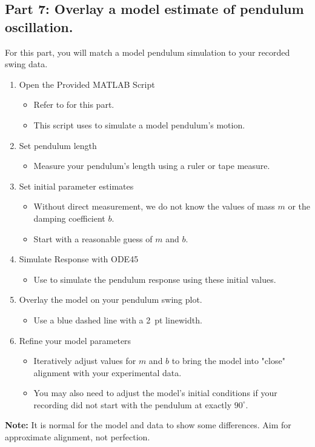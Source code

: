 \documentclass{article}
\begin{document}
\subsection{Part 7: Overlay a model estimate of pendulum oscillation. }
For this part, you will match a model pendulum simulation to your recorded swing data.

\begin{enumerate}
    \item Open the Provided MATLAB Script
    \begin{itemize}
        \item Refer to  for this part.
        \item This script uses  to simulate a model pendulum’s motion.
    \end{itemize}

    \item Set pendulum length
    \begin{itemize}
        \item Measure your pendulum’s length using a ruler or tape measure.
    \end{itemize}

    \item Set initial parameter estimates
    \begin{itemize}
        \item Without direct measurement, we do not know the values of mass $m$ or the damping coefficient $b$.
        \item Start with a reasonable guess of $m$ and $b$.
    \end{itemize}

    \item Simulate Response with ODE45
    \begin{itemize}
        \item Use  to simulate the pendulum response using these initial values.
    \end{itemize}

    \item Overlay the model on your pendulum swing plot.
    \begin{itemize}
        \item Use a blue dashed line with a 2~pt linewidth.
    \end{itemize}
    
    \item Refine your model parameters
    \begin{itemize}
        \item Iteratively adjust values for $m$ and $b$ to bring the model into "close" alignment with your experimental data.
        \item You may also need to adjust the model’s initial conditions if your recording did not start with the pendulum at exactly $90^\circ$.
    \end{itemize}
\end{enumerate}
\noindent\textbf{Note:} It is normal for the model and data to show some differences. Aim for approximate alignment, not perfection.
\end{document}
